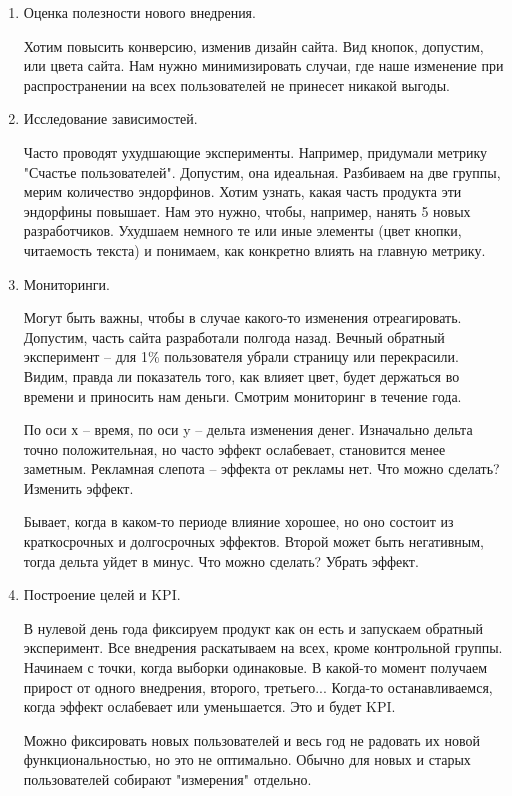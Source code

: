 \begin{enumerate}
    \item Оценка полезности нового внедрения.
    
    Хотим повысить конверсию, изменив дизайн сайта. Вид кнопок, допустим, или цвета сайта. Нам нужно минимизировать случаи, где наше изменение при распространении на всех пользователей не принесет никакой выгоды. 
    
    \item Исследование зависимостей. 
    
    Часто проводят ухудшающие эксперименты. Например, придумали метрику "Счастье пользователей". Допустим, она идеальная. Разбиваем на две группы, мерим количество эндорфинов. Хотим узнать, какая часть продукта эти эндорфины повышает. Нам это нужно, чтобы, например, нанять 5 новых разработчиков. Ухудшаем немного те или иные элементы (цвет кнопки, читаемость текста) и понимаем, как конкретно влиять на главную метрику.
    
    \item Мониторинги. 
    
    Могут быть важны, чтобы в случае какого-то изменения отреагировать. Допустим, часть сайта разработали полгода назад. Вечный обратный эксперимент -- для 1\% пользователя убрали страницу или перекрасили. Видим, правда ли показатель того, как влияет цвет, будет держаться во времени и приносить нам деньги. Смотрим мониторинг в течение года. 
    
    По оси х -- время, по оси y -- дельта изменения денег. Изначально дельта точно положительная, но часто эффект ослабевает, становится менее заметным. Рекламная слепота -- эффекта от рекламы нет. Что можно сделать? Изменить эффект.
    
    Бывает, когда в каком-то периоде влияние хорошее, но оно состоит из краткосрочных и долгосрочных эффектов. Второй может быть негативным, тогда дельта уйдет в минус. Что можно сделать? Убрать эффект.
    
    \item Построение целей и KPI. 
    
    В нулевой день года фиксируем продукт как он есть и запускаем обратный эксперимент. Все внедрения раскатываем на всех, кроме контрольной группы. Начинаем с точки, когда выборки одинаковые. В какой-то момент получаем прирост от одного внедрения, второго, третьего... Когда-то останавливаемся, когда эффект ослабевает или уменьшается. Это и будет KPI.
    
    Можно фиксировать новых пользователей и весь год не радовать их новой функциональностью, но это не оптимально. Обычно для новых и старых пользователей собирают "измерения" отдельно.
    
    
\end{enumerate}
